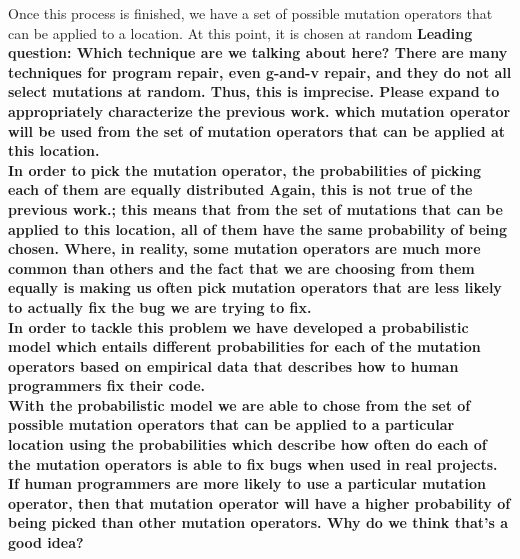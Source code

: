 \documentclass[conference]{IEEEtran}
\newcommand{\todo}[1]
  {{\scriptsize \textbf{\color{red} {#1}}}}
\begin{document}
Once this process is finished, we have a set of possible mutation operators that
can be applied to a location. At this point, it is chosen at random\todo{Leading
  question: Which technique are we talking about here?  There are many
  techniques for program repair, even g-and-v repair, and they do not all select
  mutations at random.  Thus, this is imprecise.  Please expand to appropriately
  characterize the previous work.{  which mutation operator will be used from the set of mutation operators that can be applied at this location. \\
In order to pick the mutation operator, the probabilities of picking each of
them are equally distributed\todo{Again, this is not true of the previous work.}; this means that from the set of mutations that can be applied to this location, all of them have the same probability of being chosen. Where, in reality, some mutation operators are much more common than others and the fact that we are choosing from them equally is making us often pick mutation operators that are less likely to actually fix the bug we are trying to fix.\\
In order to tackle this problem we have developed a probabilistic model which entails different probabilities for each of the mutation operators based on empirical data that describes how to human programmers fix their code.\\
With the probabilistic model we are able to chose from the set of possible
mutation operators that can be applied to a particular location using the
probabilities which describe how often do each of the mutation operators is able
to fix bugs when used in real projects. If human programmers are more likely to
use a particular mutation operator, then that mutation operator will have a
higher probability of being picked than other mutation operators.\todo{Why do we
  think that's a good idea?}\\


%
%

}}
\end{document}

